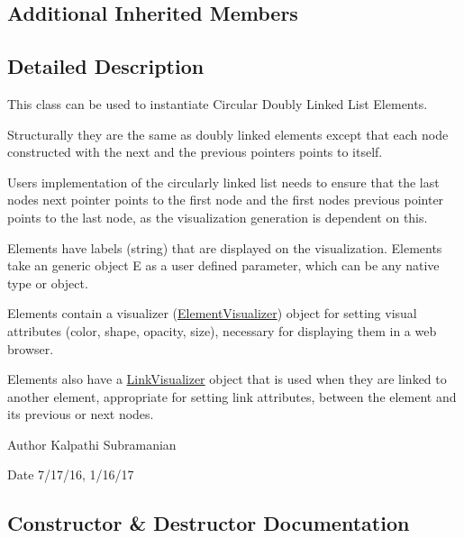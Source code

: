 \subsection*{Additional Inherited Members}


\subsection{Detailed Description}
This class can be used to instantiate Circular Doubly Linked List Elements. 

Structurally they are the same as doubly linked elements except that each node constructed with the next and the previous pointers points to itself.

User\textquotesingle{}s implementation of the circularly linked list needs to ensure that the last node\textquotesingle{}s next pointer points to the first node and the first node\textquotesingle{}s previous pointer points to the last node, as the visualization generation is dependent on this.

Elements have labels (string) that are displayed on the visualization. Elements take an generic object E as a user defined parameter, which can be any native type or object.

Elements contain a visualizer (\mbox{\hyperlink{namespace_bridges_1_1_element_visualizer}{Element\+Visualizer}}) object for setting visual attributes (color, shape, opacity, size), necessary for displaying them in a web browser.

Elements also have a \mbox{\hyperlink{namespace_bridges_1_1_link_visualizer}{Link\+Visualizer}} object that is used when they are linked to another element, appropriate for setting link attributes, between the element and its previous or next nodes.

\begin{DoxyAuthor}{Author}
Kalpathi Subramanian
\end{DoxyAuthor}
\begin{DoxyDate}{Date}
7/17/16, 1/16/17 
\end{DoxyDate}


\subsection{Constructor \& Destructor Documentation}
\mbox{\label{class_bridges_1_1_circ_d_lelement_1_1_circ_d_lelement_aaea74e300393b3589bf2f566f8916580}} 
